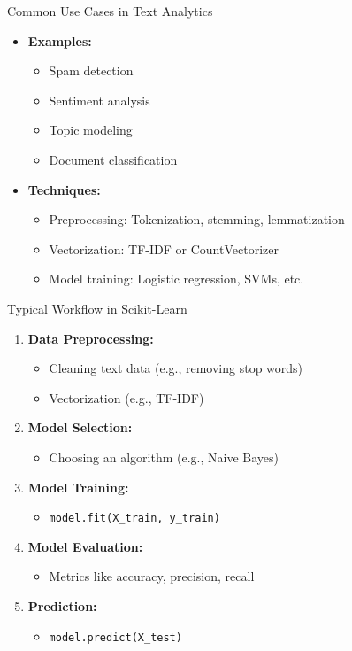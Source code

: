 	\begin{frame}{Common Use Cases in Text Analytics}
		\begin{itemize}
			\item \textbf{Examples:}
			\begin{itemize}
				\item Spam detection
				\item Sentiment analysis
				\item Topic modeling
				\item Document classification
			\end{itemize}
			\item \textbf{Techniques:}
			\begin{itemize}
				\item Preprocessing: Tokenization, stemming, lemmatization
				\item Vectorization: TF-IDF or CountVectorizer
				\item Model training: Logistic regression, SVMs, etc.
			\end{itemize}
		\end{itemize}
	\end{frame}
	
	\begin{frame}{Typical Workflow in Scikit-Learn}
		\begin{enumerate}
			\item \textbf{Data Preprocessing:}
			\begin{itemize}
				\item Cleaning text data (e.g., removing stop words)
				\item Vectorization (e.g., TF-IDF)
			\end{itemize}
			\item \textbf{Model Selection:}
			\begin{itemize}
				\item Choosing an algorithm (e.g., Naive Bayes)
			\end{itemize}
			\item \textbf{Model Training:}
			\begin{itemize}
				\item \texttt{model.fit(X\_train, y\_train)}
			\end{itemize}
			\item \textbf{Model Evaluation:}
			\begin{itemize}
				\item Metrics like accuracy, precision, recall
			\end{itemize}
			\item \textbf{Prediction:}
			\begin{itemize}
				\item \texttt{model.predict(X\_test)}
			\end{itemize}
		\end{enumerate}
	\end{frame}
	
